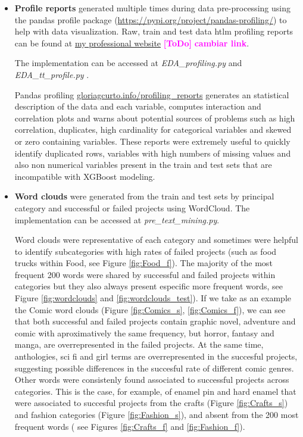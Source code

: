 \documentclass{article}
\newcommand{\ToDo}[1]{\textcolor{magenta}{\textbf{[ToDo]} \textbf{#1}}}
\begin{document}
{\begin{itemize}
\item \textbf{Profile reports} generated multiple times during data pre-processing using the pandas profile package (\url{https://pypi.org/project/pandas-profiling/}) to help with data visualization. Raw, train and test data htlm profiling reports can be found at \href{http://gloriagcurto.info}{my professional website} \ToDo{cambiar link}.

The implementation can be accessed at \emph{EDA\_profiling.py} and \emph{EDA\_tt\_profile.py }.

Pandas profiling \url{gloriagcurto.info/profiling_reports} generates an statistical description of the data and each variable, computes interaction and correlation plots and warns about potential sources of problems such as high correlation, duplicates, high cardinality for categorical variables and skewed or zero containing variables.
These reports were extremely useful to quickly identify duplicated rows, variables with high numbers of missing values and also non numerical variables present in the train and test sets that are incompatible with XGBoost modeling.

\item \textbf{Word clouds} were generated from the train and test sets by principal category and successful or failed projects using WordCloud. 
The implementation can be accessed at \emph{pre\_text\_mining.py}.

Word clouds were representative of each category and sometimes were helpful to identify subcategories with high rates of failed projects (such as food trucks within Food, see Figure \ref{fig:Food_f}). The majority of the most frequent 200 words were shared by successful and failed projects within categories but they also always present especific more frequent words, see Figure \ref{fig:wordclouds} and \ref{fig:wordclouds_test}).
If we take as an example the Comic word clouds (Figure \ref{fig:Comics_s}, \ref{fig:Comics_f}), we can see that both successful and failed projects contain graphic novel, adventure and comic with aproximatively the same frequency, but horror, fantasy and manga, are overrepresented in the failed projects. At the same time, anthologies, sci fi and girl terms are overrepresented in the succesful projects, suggesting possible differences in the succesful rate of different comic genres.
Other words were consistenly found associated to successful projects across categories. This is the case, for example, of enamel pin and hard enamel that were associated to succesful projects from the crafts (Figure \ref{fig:Crafts_s}) and fashion categories (Figure \ref{fig:Fashion_s}), and absent from the 200 most frequent words ( see Figures \ref{fig:Crafts_f} and \ref{fig:Fashion_f}).


\end{itemize}}
\end{document}
